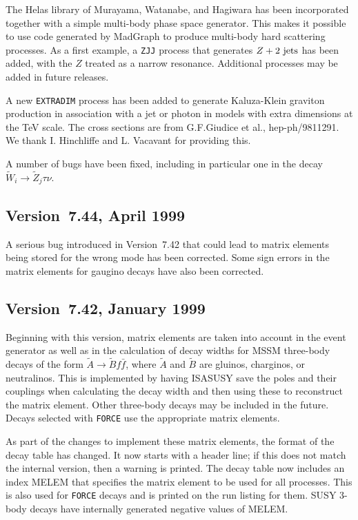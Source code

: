         The Helas library of Murayama, Watanabe, and Hagiwara has been
incorporated together with a simple multi-body phase space generator.
This makes it possible to use code generated by MadGraph to produce
multi-body hard scattering processes. As a first example, a \verb|ZJJ|
process that generates $Z + \hbox{2 jets}$ has been added, with the $Z$
treated as a narrow resonance. Additional processes may be added in
future releases.

        A new \verb|EXTRADIM| process has been added to generate
Kaluza-Klein graviton production in association with a jet or photon in
models with extra dimensions at the TeV scale. The cross sections are
from G.F.Giudice et al., hep-ph/9811291. We thank I. Hinchliffe and L.
Vacavant for providing this.

        A number of bugs have been fixed, including in particular one in
the decay $\widetilde W_i \to \widetilde Z_j \tau \nu$.

\subsection{Version~7.44, April 1999}

        A serious bug introduced in Version~7.42 that could lead to
matrix elements being stored for the wrong mode has been corrected.
Some sign errors in the matrix elements for gaugino decays have also
been corrected.

\subsection{Version~7.42, January 1999}

        Beginning with this version, matrix elements are taken into
account in the event generator as well as in the calculation of decay
widths for MSSM three-body decays of the form $\tilde A \to \tilde B f
\bar f$, where $\tilde A$ and $\tilde B$ are gluinos, charginos, or
neutralinos. This is implemented by having ISASUSY save the poles and
their couplings when calculating the decay width and then using these
to reconstruct the matrix element. Other three-body decays may be
included in the future. Decays selected with \verb|FORCE| use the
appropriate matrix elements.

        As part of the changes to implement these matrix elements, the
format of the decay table has changed. It now starts with a header
line; if this does not match the internal version, then a warning is
printed. The decay table now includes an index MELEM that specifies the
matrix element to be used for all processes. This is also used for
\verb|FORCE| decays and is printed on the run listing for them. SUSY
3-body decays have internally generated negative values of MELEM.

